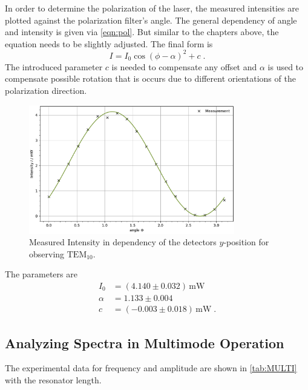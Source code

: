 In order to determine the polarization of the laser, the measured intensities are plotted against the polarization filter's angle.
The general dependency of angle and intensity is given via \eqref{eqn:pol}. But similar to the chapters above, the equation needs to be slightly adjusted.
The final form is
\begin{equation*}
    I=I_0\cos(\phi-\alpha)^2+c\; .
\end{equation*}
The introduced parameter $c$ is needed to compensate any offset and $\alpha$ is used to compensate possible rotation that is occurs due to different orientations of the polarization direction.
\begin{figure}
	\centering
	\includegraphics[width=0.8\textwidth]{content/plots/POLARI.pdf}
	\caption{Measured Intensity in dependency of the detectors $y$-position for observing $\text{TEM}_{10}$.}
	\label{fig:POLARI}
\end{figure}
The parameters are
\begin{align*}
    I_0 &= (4.140\pm 0.032) \, \text{mW}\\
\alpha &= 1.133\pm 0.004\\
c &= (-0.003\pm 0.018)\, \text{mW}\; .
\end{align*}

\subsection{Analyzing Spectra in Multimode Operation}

The experimental data for frequency and amplitude are shown in \autoref{tab:MULTI} with the resonator length.

